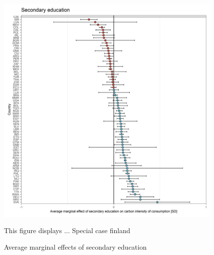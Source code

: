 \documentclass[12pt, a4paper]{article}
\newenvironment{subcaption}
{\strut
\vspace{-5pt}
\begin{minipage}[b]{0.9\textwidth}
  \hspace*{-\parindent}
  \footnotesize}
 {\end{minipage}}
\begin{document}
\begin{figure}[ht!]
  \centering
 \caption{Average marginal effects of secondary education} \label{fig:E10_sec_edu}
  \includegraphics{Analysis_OLS_ME_Carbon_Intensity/AME_OLS_CI_secondary_education}
  \begin{subcaption}
    This figure displays ... Special case finland
  \end{subcaption}

\end{figure}

\clearpage
\end{document}
